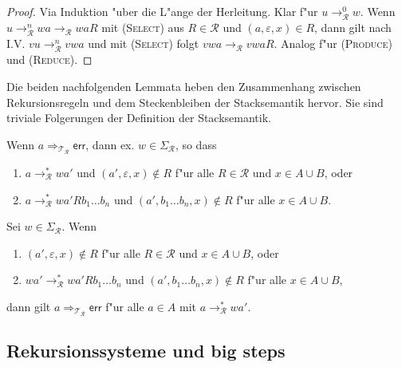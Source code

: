 \documentclass[12pt,a4paper,final]{article}
\begin{document}
\begin{proof}
  Via Induktion "uber die L"ange der Herleitung. Klar f"ur \mbox{$u \rightarrow_{\mathcal{R}}^0 w$}.
  Wenn \mbox{$u \rightarrow_{\mathcal{R}}^n wa \rightarrow_{\mathcal{R}} waR$} mit \textsc{(Select)}
  aus \mbox{$R \in \mathcal{R}$} und \mbox{$(a,\varepsilon,x)\in R$}, dann gilt nach I.V.
  \mbox{$vu \rightarrow_{\mathcal{R}}^n vwa$} und mit \textsc{(Select)} folgt 
  \mbox{$vwa \rightarrow_{\mathcal{R}} vwaR$}. Analog f"ur \textsc{(Produce)} und \textsc{(Reduce)}.
\end{proof}

Die beiden nachfolgenden Lemmata heben den Zusammenhang zwischen Rekursionsregeln
und dem Steckenbleiben der Stacksemantik hervor. Sie sind triviale Folgerungen der
Definition der Stacksemantik.
\begin{lemma} \label{lem:Steckenbleiben1}
  Wenn \mbox{$a \Rightarrow_{\mathcal{T}_{\mathcal{R}}} \mathsf{err}$},
  dann ex. \mbox{$w \in \Sigma_{\mathcal{R}}$}, so dass
  \begin{enumerate}
  \item \mbox{$a \rightarrow_{\mathcal{R}}^* wa'$} und \mbox{$(a',\varepsilon,x) \not\in R$}
    f"ur alle \mbox{$R \in \mathcal{R}$} und \mbox{$x \in A \cup B$}, oder
  \item \mbox{$a \rightarrow_{\mathcal{R}}^* wa'Rb_1 \ldots b_n$} und
    \mbox{$(a',b_1 \ldots b_n,x) \not\in R$} f"ur alle \mbox{$x \in A \cup B$}.
  \end{enumerate}
\end{lemma}

\begin{lemma}
  Sei \mbox{$w \in \Sigma_{\mathcal{R}}$}. Wenn
  \begin{enumerate}
  \item \mbox{$(a',\varepsilon,x) \not\in R$} f"ur alle \mbox{$R \in \mathcal{R}$}
    und \mbox{$x \in A \cup B$}, oder
  \item \mbox{$wa' \rightarrow_{\mathcal{R}}^* wa'Rb_1 \ldots b_n$} und
    \mbox{$(a',b_1 \ldots b_n, x) \not\in R$} f"ur alle \mbox{$x \in A \cup B$},
  \end{enumerate}
  dann gilt \mbox{$a \Rightarrow_{\mathcal{T}_{\mathcal{R}}} \mathsf{err}$} f"ur alle
  \mbox{$a \in A$} mit \mbox{$a \rightarrow_{\mathcal{R}}^* wa'$}.
\end{lemma}



\subsection{Rekursionssysteme und big steps}
\label{sec:Rekursionssysteme_und_big_steps}
\end{document}
